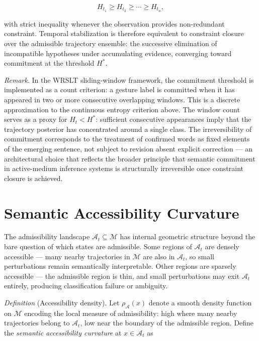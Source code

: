 \documentclass[11pt, a4paper]{article}
\theoremstyle{definition}
\begin{document}
\[
H_{t_1} \geq H_{t_2} \geq \cdots \geq H_{t_n},
\]

with strict inequality whenever the observation provides non-redundant constraint. Temporal stabilization is therefore equivalent to constraint closure over the admissible trajectory ensemble: the successive elimination of incompatible hypotheses under accumulating evidence, converging toward commitment at the threshold $H^\ast$.

\textit{Remark}. In the WRSLT sliding-window framework, the commitment threshold is implemented as a count criterion: a gesture label is committed when it has appeared in two or more consecutive overlapping windows. This is a discrete approximation to the continuous entropy criterion above. The window count serves as a proxy for $H_t < H^\ast$: sufficient consecutive appearances imply that the trajectory posterior has concentrated around a single class. The irreversibility of commitment corresponds to the treatment of confirmed words as fixed elements of the emerging sentence, not subject to revision absent explicit correction --- an architectural choice that reflects the broader principle that semantic commitment in active-medium inference systems is structurally irreversible once constraint closure is achieved.

\section{Semantic Accessibility Curvature}
\label{app:curvature}

The admissibility landscape $\mathcal{A}_t \subseteq \mathcal{M}$ has internal geometric structure beyond the bare question of which states are admissible. Some regions of $\mathcal{A}_t$ are densely accessible --- many nearby trajectories in $\mathcal{M}$ are also in $\mathcal{A}_t$, so small perturbations remain semantically interpretable. Other regions are sparsely accessible --- the admissible region is thin, and small perturbations may exit $\mathcal{A}_t$ entirely, producing classification failure or ambiguity.

\textit{Definition} (Accessibility density). Let $\rho_\mathcal{A}(x)$ denote a smooth density function on $\mathcal{M}$ encoding the local measure of admissibility: high where many nearby trajectories belong to $\mathcal{A}_t$, low near the boundary of the admissible region. Define the \emph{semantic accessibility curvature} at $x \in \mathcal{A}_t$ as
\end{document}
